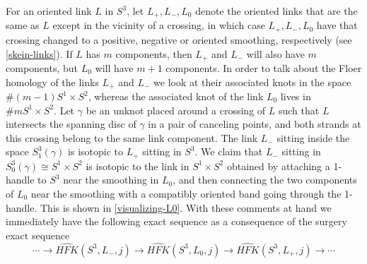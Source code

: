 For an oriented link $L$ in $S^3$, let $L_+,L_-,L_0$ denote the oriented links that are the same as $L$ except in the vicinity of a crossing, in which case $L_+,L_-,L_0$ have that crossing changed to a positive, negative or oriented smoothing, respectively (see \cref{skein-links}). If $L$ has $m$ components, then $L_+$ and $L_-$ will also have $m$ components, but $L_0$ will have $m+1$ components. In order to talk about the Floer homology of the links $L_+$ and $L_-$ we look at their associated knots in the space $\# (m-1) S^1 \times S^2$, whereas the associated knot of the link $L_0$ lives in $\# m S^1 \times S^2$. Let $\gamma$ be an unknot placed around a crossing of $L$ such that $L$ intersects the spanning disc of $\gamma$ in a pair of canceling points, and both strands at this crossing belong to the same link component. The link $L_-$ sitting inside the space $S_1^3(\gamma)$ is isotopic to $L_+$ sitting in $S^3$. We claim that $L_-$ sitting in $S_0^3(\gamma) \cong S^1 \times S^2$ is isotopic to the link in $S^1 \times S^2$ obtained by attaching a 1-handle to $S^3$ near the smoothing in $L_0$, and then connecting the two components of $L_0$ near the smoothing with a compatibly oriented band going through the 1-handle. This is shown in \cref{visualizing-L0}. With these comments at hand we immediately have the following exact sequence as a consequence of the surgery exact sequence
\[ \cdots \longrightarrow \widehat{HFK}(S^3,L_-,j) \longrightarrow \widehat{HFK}(S^3,L_0,j) \longrightarrow \widehat{HFK}(S^3,L_+,j) \longrightarrow \cdots \]

